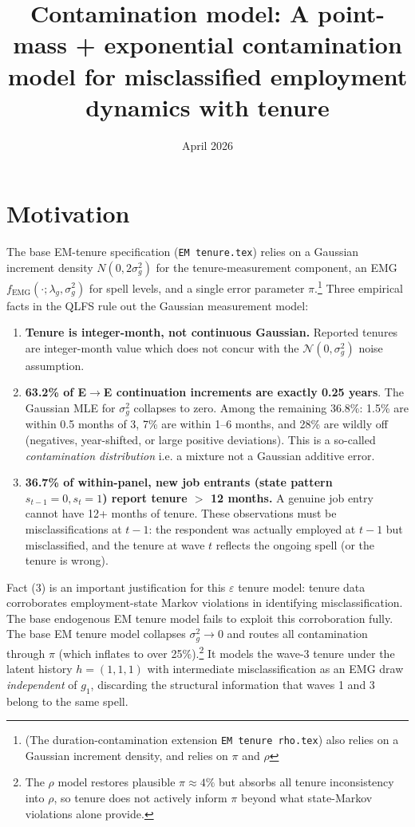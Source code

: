 \documentclass[12pt]{article}
\begin{document}
\title{Contamination model: A point-mass + exponential contamination model for misclassified employment dynamics with tenure}
\author{}
\date{April 2026}
\maketitle

\section{Motivation}

The base EM-tenure specification (\texttt{EM tenure.tex}) relies on a
Gaussian increment density \(N(0, 2\sigma_g^2)\) for the tenure-measurement
component, an EMG \(f_{\mathrm{EMG}}(\cdot;\lambda_g,\sigma_g^2)\) for spell
levels, and a single error parameter \(\pi\).\footnote{(The
duration-contamination extension \texttt{EM tenure rho.tex}) also relies on a Gaussian increment density, and relies on $\pi$ and $\rho$ } Three empirical facts in the QLFS rule out the Gaussian
measurement model:

\begin{enumerate}
\item \textbf{Tenure is integer-month, not continuous Gaussian.} 
  Reported tenures are integer-month value which does not concur with the
  \(\mathcal{N}(0,\sigma_g^2)\) noise assumption.
\item \textbf{63.2\% of E\(\to\)E continuation increments are exactly 0.25
  years}. The Gaussian MLE for \(\sigma_g^2\)
  collapses to zero. Among the remaining 36.8\%: 1.5\% are within 0.5 months
  of 3, 7\% are within 1--6 months, and 28\% are wildly off (negatives,
  year-shifted, or large positive deviations). This is a so-called \textit{contamination
  distribution} \textemdash i.e. a mixture \textemdash not a Gaussian additive error.
\item \textbf{36.7\% of within-panel, new job entrants (state pattern
  \(s_{t-1}=0,s_t=1\)) report tenure \(>\) 12 months.} A genuine job entry
  cannot have 12+ months of tenure. These observations must be
  misclassifications at \(t-1\): the respondent was actually employed at
  \(t-1\) but misclassified, and the tenure at wave \(t\) reflects the
  ongoing spell (or the tenure is wrong).
\end{enumerate}

Fact (3) is an important justification for this \(\varepsilon\) tenure model: tenure
data corroborates employment-state Markov violations in identifying misclassification.
The base endogenous EM tenure model fails to exploit this corroboration
fully. The base EM tenure model collapses \(\sigma_g^2 \to 0\) and routes all
contamination through \(\pi\) (which inflates to over 25\%).\footnote{The \(\rho\) model
restores plausible \(\pi \approx 4\%\) but absorbs all tenure inconsistency
into \(\rho\), so tenure does not actively inform \(\pi\) beyond what
state-Markov violations alone provide.} It models the wave-3 tenure under
the latent history \(h=(1,1,1)\) with intermediate misclassification as an
EMG draw \emph{independent} of \(g_1\), discarding the structural information
that waves 1 and 3 belong to the same spell. 
\end{document}
